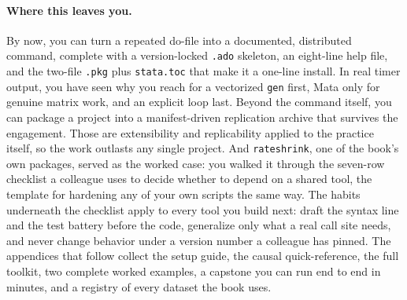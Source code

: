 \paragraph{Where this leaves you.} By now, you can turn a repeated do-file into a documented, distributed command, complete with a version-locked \texttt{.ado} skeleton, an eight-line help file, and the two-file \texttt{.pkg} plus \texttt{stata.toc} that make it a one-line install. In real timer output, you have seen why you reach for a vectorized \texttt{gen} first, Mata only for genuine matrix work, and an explicit loop last. Beyond the command itself, you can package a project into a manifest-driven replication archive that survives the engagement. Those are extensibility and replicability applied to the practice itself, so the work outlasts any single project. And \texttt{rateshrink}, one of the book's own packages, served as the worked case: you walked it through the seven-row checklist a colleague uses to decide whether to depend on a shared tool, the template for hardening any of your own scripts the same way. The habits underneath the checklist apply to every tool you build next: draft the syntax line and the test battery before the code, generalize only what a real call site needs, and never change behavior under a version number a colleague has pinned. The appendices that follow collect the setup guide, the causal quick-reference, the full toolkit, two complete worked examples, a capstone you can run end to end in minutes, and a registry of every dataset the book uses.

